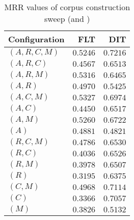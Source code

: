 
\begin{table}
\begin{spacing}{1.2}
\centering
\caption{MRR values of \bookkeeper corpus construction sweep (\cone and \ctwo)}
\label{table:bookkeeper_corpus_sweep}
\vspace{0.2em}
\begin{tabular}{lrr}
\toprule
Configuration &           FLT &           DIT \\
\midrule
  $(A,R,C,M)$ &      $0.5246$ & $\bm{0.7216}$ \\
    $(A,R,C)$ &      $0.4567$ &      $0.6513$ \\
    $(A,R,M)$ &      $0.5316$ &      $0.6465$ \\
      $(A,R)$ &      $0.4970$ &      $0.5425$ \\
    $(A,C,M)$ & $\bm{0.5327}$ &      $0.6974$ \\
      $(A,C)$ &      $0.4450$ &      $0.6517$ \\
      $(A,M)$ &      $0.5260$ &      $0.6722$ \\
        $(A)$ &      $0.4881$ &      $0.4821$ \\
    $(R,C,M)$ &      $0.4786$ &      $0.6530$ \\
      $(R,C)$ &      $0.4036$ &      $0.6526$ \\
      $(R,M)$ &      $0.3978$ &      $0.6507$ \\
        $(R)$ &      $0.3195$ &      $0.6375$ \\
      $(C,M)$ &      $0.4968$ &      $0.7114$ \\
        $(C)$ &      $0.3366$ &      $0.7057$ \\
        $(M)$ &      $0.3826$ &      $0.5132$ \\
\bottomrule
\end{tabular}

\end{spacing}
\end{table}
